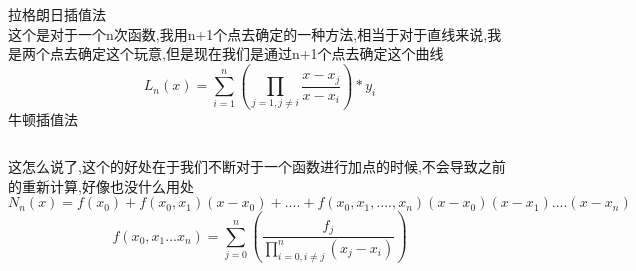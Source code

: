 \documentclass[a4paper,11pt]{article}
\begin{document}
\begin{CJK}{UTF8}{gbsn}

拉格朗日插值法\\
这个是对于一个n次函数,我用n+1个点去确定的一种方法,相当于对于直线来说,我是两个点去确定这个玩意,但是现在我们是通过n+1个点去确定这个曲线
$$ L_n(x) = \sum_{i = 1}^n(\prod_{j=1,j \neq i}\frac{x-x_j}{x-x_i})*y_i$$
牛顿插值法\\
\inputminted{c++}{../scoure/math/lang.cpp}
这怎么说了,这个的好处在于我们不断对于一个函数进行加点的时候,不会导致之前的重新计算,好像也没什么用处
$$N_n(x) = f(x_0) + f(x_0,x_1)(x-x_0)+  .... +f(x_0,x_1,....,x_n)(x-x_0)(x-x_1)....(x - x_n)$$
$$ f(x_0,x_1...x_n) = \sum_{j = 0}^n(\frac{f_j}{\prod_{i =0,i \neq j}^n(x_j-x_i)} )$$
\end{CJK}
\end{document}
